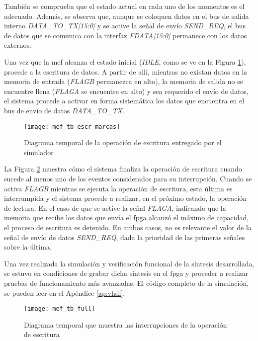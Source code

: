 También se comprueba que el estado actual en cada uno de los momentos es el adecuado. Además, se observa que, aunque se coloquen datos en el bus de salida interno {\it DATA\_TO\_TX[15:0]} y se active la señal de envío
{\it SEND\_REQ}, el bus de datos que se comunica con la interfaz {\it FDATA[15:0]} permanece con los datos externos.

Una vez que la \acrshort{mef} alcanza el estado inicial ({\it IDLE}, como se ve en la Figura \ref{tb:escr}), procede a la escritura de datos. A partir de allí, mientras no existan datos en la memoria de entrada ({\it FLAGB} permanezca en alto), la memoria de salida no se encuentre llena ({\it FLAGA} se encuentre en alto) y sea requerido el envío de datos, el sistema procede a activar en forma sistemática los datos que encuentra en el bus de envío de datos {\it DATA\_TO\_TX}.

\begin{figure}[t]
	\centering
	\texttt{[image: mef\_tb\_escr\_marcas]}
	\caption{Diagrama temporal de la operación de escritura entregado por el simulador}
	\label{tb:escr}
\end{figure}

La Figura \ref{tb:inter} muestra cómo el sistema finaliza la operación de escritura cuando sucede al menos uno de los eventos considerados para su interrupción. Cuando se activa {\it FLAGB} mientras se ejecuta la operación de escritura, esta última es interrumpida y el sistema procede a realizar, en el próximo estado, la operación de lectura. En el caso de que se active la señal {\it FLAGA}, indicando que la memoria que recibe los datos que envía el \acrshort{fpga} alcanzó el máximo de capacidad, el proceso de escritura es detenido. En ambos casos, no es relevante el valor de la señal de envío de datos {\it SEND\_REQ}, dada la prioridad de las primeras señales sobre la última.
 
Una vez realizada la simulación y verificación funcional de la síntesis desarrollada, se estuvo en condiciones de grabar dicha síntesis en el \acrshort{fpga} y proceder a realizar pruebas de funcionamiento más avanzadas. 
El código completo de la simulación, se pueden leer en el Apéndice \ref{ap:vhdl}.

\begin{figure}[h]
	\centering
	\texttt{[image: mef\_tb\_full]}
	\caption{Diagrama temporal que muestra las interrupciones de la operación de escritura}
	\label{tb:inter}
\end{figure}